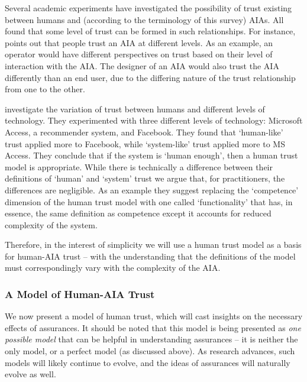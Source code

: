         Several academic experiments have investigated the possibility of trust existing between humans and (according to the terminology of this survey) AIAs. All found that some level of trust can be formed in such relationships. For instance, \citet{Lacher2014-yc} points out that people trust an AIA at different levels. As an example, an operator would have different perspectives on trust based on their level of interaction with the AIA. The designer of an AIA would also trust the AIA differently than an end user, due to the differing nature of the trust relationship from one to the other. 

        \citet{Tripp2011-rx} investigate the variation of trust between humans and different levels of technology. They experimented with three different levels of technology: Microsoft Access, a recommender system, and Facebook. They found that `human-like' trust applied more to Facebook, while `system-like' trust applied more to MS Access. They conclude that if the system is `human enough', then a human trust model is appropriate. While there is technically a difference between their definitions of `human' and `system' trust we argue that, for practitioners, the differences are negligible. As an example they suggest replacing the `competence' dimension of the human trust model with one called `functionality' that has, in essence, the same definition as competence except it accounts for reduced complexity of the system.

        Therefore, in the interest of simplicity we will use a human trust model as a basis for human-AIA trust -- with the understanding that the definitions of the model must correspondingly vary with the complexity of the AIA.

\subsubsection{A Model of Human-AIA Trust}
        We now present a model of human trust, which will cast insights on the necessary effects of assurances. It should be noted that this model is being presented as \emph{one possible model} that can be helpful in understanding assurances -- it is neither the only model, or a perfect model (as discussed above). As research advances, such models will likely continue to evolve, and the ideas of assurances will naturally evolve as well.

